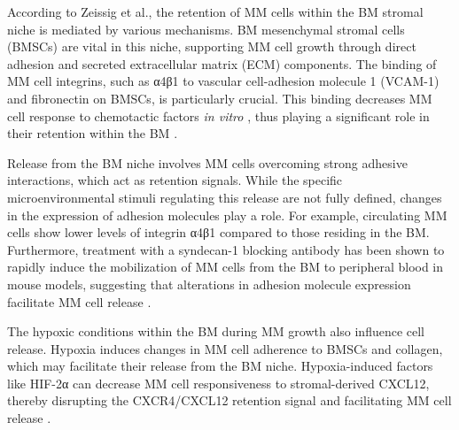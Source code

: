 
According to Zeissig et al., the retention of MM cells within the BM stromal
niche is mediated by various mechanisms. BM mesenchymal stromal cells (BMSCs)
are vital in this niche, supporting MM cell growth through direct adhesion and
secreted extracellular matrix (ECM) components. The binding of MM cell
integrins, such as α4β1 to vascular cell-adhesion molecule 1 (VCAM-1) and
fibronectin on BMSCs, is particularly crucial. This binding decreases MM cell
response to chemotactic factors \textit{in vitro}
\cite{shibayamaLamininFibronectinPromote1995a}, thus playing a significant role
in their retention within the BM \cite{zeissigTumourDisseminationMultiple2020}.

Release from the BM niche involves MM cells overcoming strong adhesive
interactions, which act as retention signals. While the specific
microenvironmental stimuli regulating this release are not fully defined,
changes in the expression of adhesion molecules play a role. For example,
circulating MM cells show lower levels of integrin α4β1 
compared to those residing in the BM. Furthermore, treatment with a syndecan-1 blocking antibody
has been shown to rapidly induce the mobilization of MM cells from the BM to
peripheral blood in mouse models, suggesting that alterations in adhesion
molecule expression facilitate MM cell release
\cite{zeissigTumourDisseminationMultiple2020}.

The hypoxic conditions within the BM during MM growth also influence cell
release. Hypoxia induces changes in MM cell adherence to BMSCs and collagen,
which may facilitate their release from the BM niche. Hypoxia-induced factors
like HIF-2α can decrease MM cell responsiveness to stromal-derived CXCL12,
thereby disrupting the CXCR4/CXCL12 retention signal and facilitating MM cell
release \cite{zeissigTumourDisseminationMultiple2020}.

